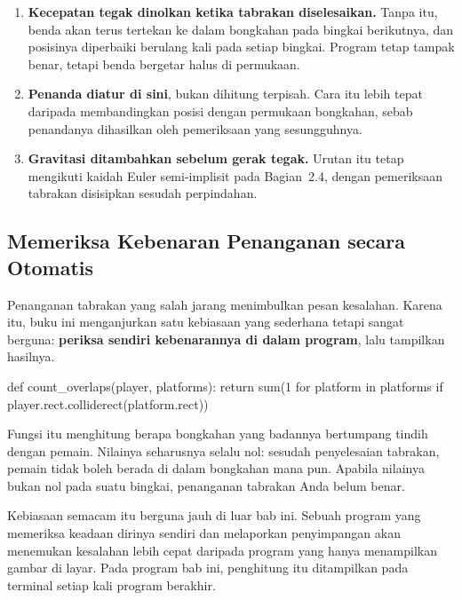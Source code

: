 \begin{enumerate}
  \item \textbf{Kecepatan tegak dinolkan ketika tabrakan diselesaikan.} Tanpa
        itu, benda akan terus tertekan ke dalam bongkahan pada bingkai
        berikutnya, dan posisinya diperbaiki berulang kali pada setiap bingkai.
        Program tetap tampak benar, tetapi benda bergetar halus di permukaan.
  \item \textbf{Penanda  diatur di sini}, bukan dihitung
        terpisah. Cara itu lebih tepat daripada membandingkan posisi dengan
        permukaan bongkahan, sebab penandanya dihasilkan oleh pemeriksaan yang
        sesungguhnya.
  \item \textbf{Gravitasi ditambahkan sebelum gerak tegak.}
        Urutan itu tetap mengikuti kaidah Euler semi-implisit pada
        Bagian~2.4, dengan pemeriksaan tabrakan disisipkan sesudah perpindahan.
\end{enumerate}

\subsection{Memeriksa Kebenaran Penanganan secara Otomatis}

Penanganan tabrakan yang salah jarang menimbulkan pesan kesalahan. Karena itu,
buku ini menganjurkan satu kebiasaan yang sederhana tetapi sangat berguna:
\textbf{periksa sendiri kebenarannya di dalam program}, lalu tampilkan
hasilnya.

\begin{kodekeluaran}
def count_overlaps(player, platforms):
    return sum(1 for platform in platforms
               if player.rect.colliderect(platform.rect))
\end{kodekeluaran}

Fungsi itu menghitung berapa bongkahan yang badannya bertumpang tindih dengan
pemain. Nilainya seharusnya selalu nol: sesudah penyelesaian tabrakan, pemain
tidak boleh berada di dalam bongkahan mana pun. Apabila nilainya bukan nol pada
suatu bingkai, penanganan tabrakan Anda belum benar.

Kebiasaan semacam itu berguna jauh di luar bab ini. Sebuah program yang
memeriksa keadaan dirinya sendiri dan melaporkan penyimpangan akan menemukan
kesalahan lebih cepat daripada program yang hanya menampilkan gambar di layar.
Pada program bab ini, penghitung itu ditampilkan pada terminal setiap kali
program berakhir.

